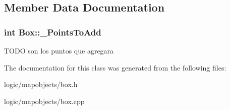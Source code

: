 \subsection{Member Data Documentation}
\hypertarget{class_box_a6bad20b31366e6c10dd372d46521f566}{
\subsubsection[{\-\_\-\-Points\-To\-Add}]{\setlength{\rightskip}{0pt plus 5cm}int Box\-::\-\_\-\-Points\-To\-Add\hspace{0.3cm}{\ttfamily [protected]}}}\label{class_box_a6bad20b31366e6c10dd372d46521f566}
T\-O\-D\-O son los puntos que agregara 

The documentation for this class was generated from the following files\-:\begin{DoxyCompactItemize}
\item 
logic/mapobjects/box.\-h\item 
logic/mapobjects/box.\-cpp\end{DoxyCompactItemize}
